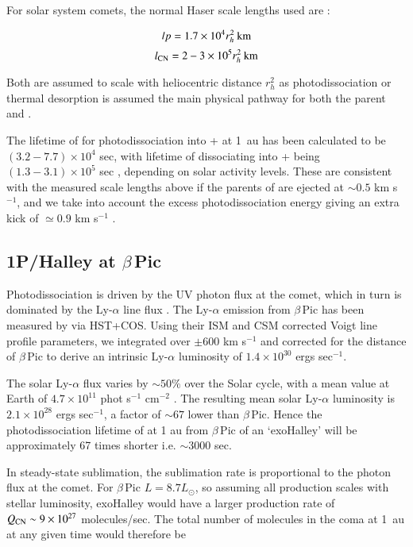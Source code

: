 \documentclass{aa}
\newcommand{\kms}{km s$^{-1}$}
\newcommand{\bp}{$\beta$\,Pic}
\begin{document}
For solar system comets, the normal Haser scale lengths used are \citep{Cochran86,AHearn1995} :

$$lp=1.7\times10^4r_h^2\:{\rm km}$$
$$l_{\ce{CN}}=2-3\times10^5r_h^2\:{\rm km}$$

Both are assumed to scale with heliocentric distance $r_h^2$ as photodissociation or thermal desorption is assumed the main physical pathway for both the parent and .

The lifetime of  for photodissociation into + at 1~au has been calculated to be $(3.2-7.7)\times10^4$ sec, with lifetime of  dissociating into + being $(1.3-3.1)\times10^5$ sec \citep{Huebner92}, depending on solar activity levels.
%
These are consistent with the measured scale lengths above if the parents of  are ejected at $\sim 0.5$ \kms{}, and we take into account the excess photodissociation energy giving  an extra kick of $\simeq0.9$ \kms{} \citep{Fray2005}. 

\subsection{1P/Halley at \texorpdfstring{\bp{}}{Beta Pictoris}}

Photodissociation is  driven by the UV photon flux at the comet, which in turn is dominated by the Ly-$\alpha$ line flux \citep{Combi80}.
%
The  Ly-$\alpha$ emission from \bp{} has been measured by \citet{Wilson17} via HST+COS.
%
Using their ISM and CSM corrected Voigt line profile parameters, we integrated over $\pm600$ \kms{} and corrected for the distance of \bp{} to derive an intrinsic Ly-$\alpha$ luminosity of $1.4\times10^{30}$ ergs sec$^{-1}$.

The solar Ly-$\alpha$ flux varies by $\sim 50\% $ over the Solar cycle, with a mean value at Earth of $4.7\times10^{11}$ phot s$^{-1}$ cm$^{-2}$ \citep{Woods00}.
%
The resulting mean solar Ly-$\alpha$ luminosity is $2.1\times10^{28}$ ergs sec$^{-1}$, a factor of $\sim 67$ lower than \bp{}.
%
Hence the photodissociation lifetime of  at 1 au from \bp{} of an `exoHalley' will be approximately 67 times shorter i.e. $\sim 3000$ sec.

In steady-state sublimation, the sublimation rate is proportional to the photon flux at the comet.
%
For \bp{} $L=8.7L_\odot$, so assuming all  production scales with stellar luminosity, exoHalley would have a larger  production rate of $Q_{\ce{CN}}\sim 9\times10^{27}$ molecules/sec.
%
The total number of  molecules in the coma at 1~au at any given time would therefore be
\end{document}
